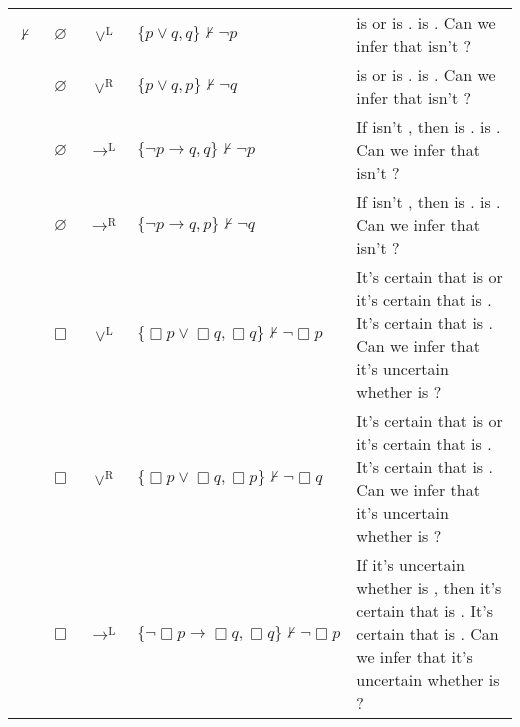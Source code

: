 \begin{tabular}{
  @{}ccclp{}@{}
  }
$\nvdash$
& $\varnothing$ & $\lor^{\mathrm{L}}$ & $\{p \lor q, q\} \nvdash \lnot p$ & 
   \subjectA{} is \vpA{} or \subjectB{} is \vpB{}.\newline
  \subjectB{} is \vpB{}.\newline
  Can we infer that \subjectA{} isn't \vpA{}? \\
& $\varnothing$ & $\lor^{\mathrm{R}}$ & $\{p \lor q, p\} \nvdash \lnot q$ & 
   \subjectA{} is \vpA{} or \subjectB{} is \vpB{}.\newline
  \subjectA{} is \vpA{}.\newline
  Can we infer that \subjectB{} isn't \vpB{}? \\
& $\varnothing$ & $\rightarrow^{\mathrm{L}}$ & $\{\lnot p \to q, q\} \nvdash \lnot p$ & 
   If \subjectA{} isn't \vpA{}, then \subjectB{} is \vpB{}.\newline
  \subjectB{} is \vpB{}.\newline
  Can we infer that \subjectA{} isn't \vpA{}? \\
& $\varnothing$ & $\rightarrow^{\mathrm{R}}$ & $\{\lnot p \to q, p\} \nvdash \lnot q$ & 
   If \subjectA{} isn't \vpA{}, then \subjectB{} is \vpB{}.\newline
  \subjectA{} is \vpA{}.\newline
  Can we infer that \subjectB{} isn't \vpB{}? \\
& $\Box$ & $\lor^{\mathrm{L}}$ & $\{\Box p \lor \Box q, \Box q\} \nvdash \lnot \Box p$ & 
   It's certain that \subjectA{} is \vpA{} or it's certain that \subjectB{} is \vpB{}.\newline
  It's certain that \subjectB{} is \vpB{}.\newline
  Can we infer that it's uncertain whether \subjectA{} is \vpA{}? \\
& $\Box$ & $\lor^{\mathrm{R}}$ & $\{\Box p \lor \Box q, \Box p\} \nvdash \lnot \Box q$ & 
   It's certain that \subjectA{} is \vpA{} or it's certain that \subjectB{} is \vpB{}.\newline
  It's certain that \subjectA{} is \vpA{}.\newline
  Can we infer that it's uncertain whether \subjectB{} is \vpB{}? \\
& $\Box$ & $\rightarrow^{\mathrm{L}}$ & $\{\lnot \Box p \to \Box q, \Box q\} \nvdash \lnot \Box p$ & 
   If it's uncertain whether \subjectA{} is \vpA{}, then it's certain that \subjectB{} is \vpB{}.\newline
  It's certain that \subjectB{} is \vpB{}.\newline
  Can we infer that it's uncertain whether \subjectA{} is \vpA{}? \\

\end{tabular}
